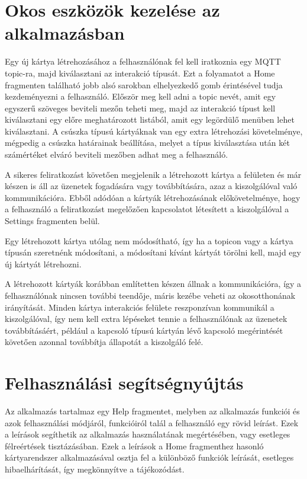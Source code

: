 \documentclass[]{thesis-ekf}
\theoremstyle{definition}
\theoremstyle{remark}
\begin{document}
\section{Okos eszközök kezelése az alkalmazásban}
Egy új kártya létrehozásához a felhasználónak fel kell iratkoznia egy MQTT topic-ra, majd kiválasztani az interakció
típusát. Ezt a folyamatot a Home fragmenten található jobb alsó sarokban elhelyezkedő gomb érintésével
tudja kezdeményezni a felhasználó. Először meg kell adni a topic nevét, amit egy egyszerű szöveges beviteli mezőn
teheti meg, majd az interakció típust kell kiválasztani egy előre meghatározott listából, amit egy legördülő
menüben lehet kiválasztani. A csúszka típusú kártyáknak van egy extra létrehozási követelménye, mégpedig a
csúszka határainak beállítása, melyet a típus kiválasztása után két számértéket elváró beviteli mezőben adhat
meg a felhasználó.

A sikeres feliratkozást követően megjelenik a létrehozott kártya a felületen és már készen is áll az üzenetek
fogadására vagy továbbítására, azaz a kiszolgálóval való kommunikációra. Ebből adódóan a kártyák létrehozásának
előkövetelménye, hogy a felhasználó a feliratkozást megelőzően kapcsolatot létesített a kiszolgálóval a Settings 
fragmenten belül.

Egy létrehozott kártya utólag nem módosítható, így ha a topicon vagy a kártya típusán szeretnénk módosítani,
a módosítani kívánt kártyát törölni kell, majd egy új kártyát létrehozni.

A létrehozott kártyák korábban említetten készen állnak a kommunikációra, így a felhasználónak nincsen további teendője,
máris kezébe veheti az okosotthonának irányítását. Minden kártya interakciós felülete reszponzívan kommunikál
a kiszolgálóval, így nem kell extra lépéseket tennie a felhasználónak az üzenetek továbbításáért, például a kapcsoló
típusú kártyán lévő kapcsoló megérintését követően azonnal továbbítja állapotát a kiszolgáló felé.

\section{Felhasználási segítségnyújtás}
Az alkalmazás tartalmaz egy Help fragmentet, melyben az alkalmazás funkciói és azok felhasználási módjáról,
funkcióiról talál a felhasználó egy rövid leírást. Ezek a leírások segíthetik az alkalmazás használatának
megértésében, vagy esetleges félreértések tisztázásában. Ezek a leírások a Home fragmenthez hasonló kártyarendszer
alkalmazásával osztja fel a különböző funkciók leírását, esetleges hibaelhárítását, így megkönnyítve a tájékozódást.
\end{document}
